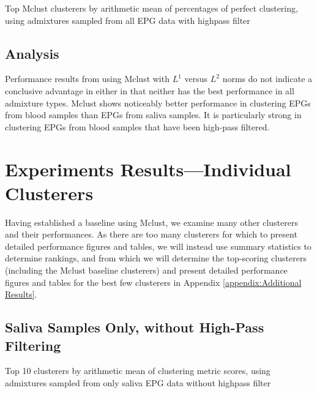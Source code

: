 \begin{table}[htbp]
\centering
{}
\caption{Top Mclust clusterers by arithmetic mean of percentages of perfect clustering, using admixtures sampled from all EPG data with highpass filter}
\label{table:top_mclust_clusterers_by_binomial_confidence_highpass_71-sampleids_all-nruns_1000}
\end{table}

\FloatBarrier
\subsection{Analysis}

Performance results from using Mclust with $L^{1}$ versus $L^{2}$ norms do not indicate a conclusive advantage in either in that neither has the best performance in all admixture types. Mclust shows noticeably better performance in clustering EPGs from blood samples than EPGs from saliva samples. It is particularly strong in clustering EPGs from blood samples that have been high-pass filtered.

\section{Experiments Results---Individual Clusterers}

Having established a baseline using Mclust, we examine many other clusterers and their performances. As there are too many clusterers for which to present detailed performance figures and tables, we will instead use summary statistics to determine rankings, and from which we will determine the top-scoring clusterers (including the Mclust baseline clusterers) and present detailed performance figures and tables for the best few clusterers in Appendix \ref{appendix:Additional Results}.

\FloatBarrier
\subsection{Saliva Samples Only, without High-Pass Filtering}

\begin{table}[htbp]
\centering
{}
\caption{Top 10 clusterers by arithmetic mean of clustering metric scores, using admixtures sampled from only saliva EPG data without highpass filter}
\label{table:top_10_not_ensemble_clusterers_by_metrics_highpass_0-sampleids_saliva-nruns_1000}
\end{table}

